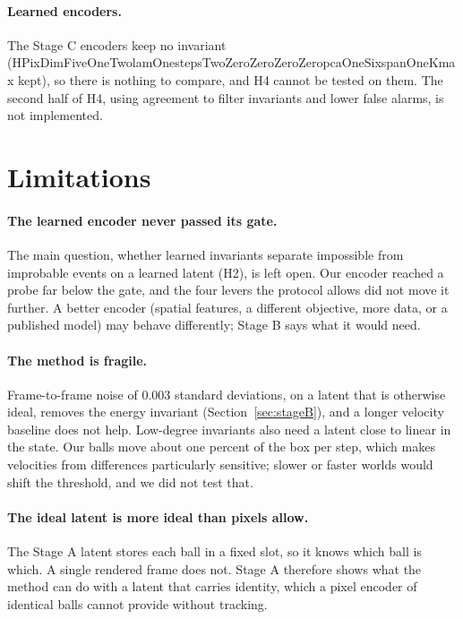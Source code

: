 \documentclass[11pt]{article}
\newcommand{\Hp}[1]{\csname HPixDimFiveOneTwolamOnestepsTwoZeroZeroZeroZeropcaOneSixspanOne#1\endcsname}
\begin{document}
\paragraph{Learned encoders.} The Stage C encoders keep no invariant (\Hp{Kmax} kept), so there is
nothing to compare, and H4 cannot be tested on them. The second half of H4, using agreement to filter
invariants and lower false alarms, is not implemented.



\FloatBarrier
\section{Limitations}\label{sec:limits}

\paragraph{The learned encoder never passed its gate.} The main question, whether learned invariants
separate impossible from improbable events on a learned latent (H2), is left open. Our encoder
reached a probe far below the gate, and the four levers the protocol allows did not move it
further. A better encoder (spatial features, a different objective, more data, or a published model)
may behave differently; Stage B says what it would need.

\paragraph{The method is fragile.} Frame-to-frame noise of 0.003 standard deviations, on a latent that
is otherwise ideal, removes the energy invariant (Section~\ref{sec:stageB}), and a longer velocity
baseline does not help. Low-degree invariants also need a latent close to linear in the state. Our
balls move about one percent of the box per step, which makes velocities from differences
particularly sensitive; slower or faster worlds would shift the threshold, and we did not test that.

\paragraph{The ideal latent is more ideal than pixels allow.} The Stage A latent stores each ball in
a fixed slot, so it knows which ball is which. A single rendered frame does not. Stage A therefore
shows what the method can do with a latent that carries identity, which a pixel encoder of identical
balls cannot provide without tracking.
\end{document}
